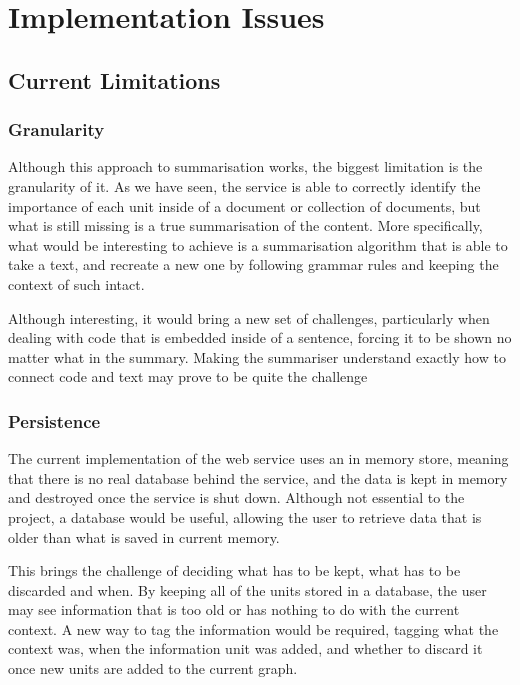 \section{Implementation Issues}\label{sec:implementationIssues}

\subsection{Current Limitations}
\subsubsection{Granularity}
Although this approach to summarisation works, the biggest limitation is the granularity of it. As we have seen, the service is able to correctly identify the importance of each unit inside of a document or collection of documents, but what is still missing is a true summarisation of the content. More specifically, what would be interesting to achieve is a summarisation algorithm that is able to take a text, and recreate a new one by following grammar rules and keeping the context of such intact.

Although interesting, it would bring a new set of challenges, particularly when dealing with code that is embedded inside of a sentence, forcing it to be shown no matter what in the summary. Making the summariser understand exactly how to connect code and text may prove to be quite the challenge

\subsubsection{Persistence}
The current implementation of the web service uses an in memory store, meaning that there is no real database behind the service, and the data is kept in memory and destroyed once the service is shut down. Although not essential to the project, a database would be useful, allowing the user to retrieve data that is older than what is saved in current memory. 

This brings the challenge of deciding what has to be kept, what has to be discarded and when. By keeping all of the units stored in a database, the user may see information that is too old or has nothing to do with the current context. A new way to tag the information would be required, tagging what the context was, when the information unit was added, and whether to discard it once new units are added to the current graph.

